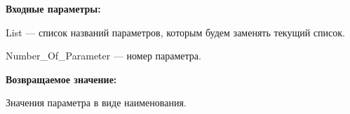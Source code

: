 \textbf{Входные параметры:}

List --- список названий параметров, которым будем заменять текущий список.
 
    Number\_Of\_Parameter --- номер параметра.

\textbf{Возвращаемое значение:}

Значения параметра в виде наименования.
